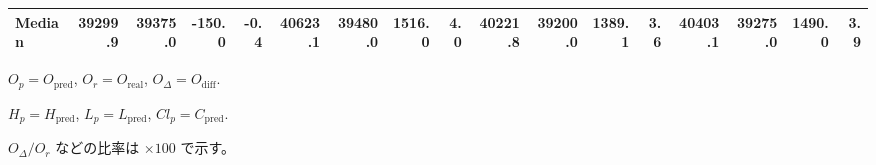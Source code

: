 \begin{threeparttable}
{\begin{tabular}{lrrrrrrrrrrrrrrrr}
 Median & 39299.9 & 39375.0 &     -150.0 &           -0.4 & 40623.1 & 39480.0 &     1516.0 &            4.0 & 40221.8 & 39200.0 &     1389.1 &            3.6 & 40403.1 & 39275.0 &      1490.0 &              3.9 \\
\bottomrule
\end{tabular}
}
\begin{tablenotes}\footnotesize
\item $O_p=O_{\text{pred}}$, $O_r=O_{\text{real}}$, $O_\Delta=O_{\text{diff}}$.
\item $H_p=H_{\text{pred}}$, $L_p=L_{\text{pred}}$, $Cl_p=C_{\text{pred}}$.
\item $O_\Delta/O_r$ などの比率は \(\times100\) で示す。
\end{tablenotes}
\end{threeparttable}
\endgroup
